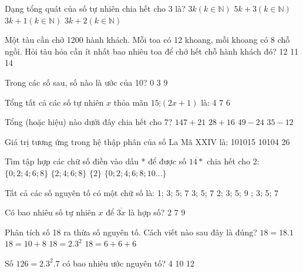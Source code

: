 \begin{ex}
Dạng tổng quát của số tự nhiên chia hết cho 3 là?
\choice
{\True $3k (k\in\mathbb{N})$}
{$5k+3 (k\in\mathbb{N})$}
{$3k+1 (k\in\mathbb{N})$}
{$3k+2 (k\in\mathbb{N})$}
\end{ex}

\begin{ex}
Một tàu cần chở 1200 hành khách. Mỗi toa có 12 khoang, mỗi khoang có 8 chỗ ngồi. Hỏi tàu hỏa cần ít nhất bao nhiêu toa để chở hết chỗ hành khách đó?
\choice
{12}
{}
{11}
{14}
\end{ex}

\begin{ex}
Trong các số sau, số nào là ước của 10?
\choice
{}
{0}
{3}
{9}
\end{ex}

\begin{ex}
Tổng tất cả các số tự nhiên $x$ thỏa mãn $15 \vdots (2x+1)$ là:
\choice
{}
{4}
{7}
{6}
\end{ex}

\begin{ex}
Tổng (hoặc hiệu) nào dưới đây chia hết cho 7?
\choice
{\True $147+21$}
{$28+16$}
{$49-24$}
{$35-12$}
\end{ex}

\begin{ex}
Giá trị tương ứng trong hệ thập phân của số La Mã XXIV là:
\choice
{101015}
{10104}
{}
{26}
\end{ex}

\begin{ex}
Tìm tập hợp các chữ số điền vào dấu * để được số $\overline{14*}$ chia hết cho 2:
\choice
{\True $\{0;2;4;6;8\}$}
{$\{2;4;6;8\}$}
{$\{2\}$}
{$\{0;2;4;6;8;10...\}$}
\end{ex}

\begin{ex}
Tất cả các số nguyên tố có một chữ số là:
\choice
{1; 3; 5; 7}
{3; 5; 7}
{2; 3; 5; 9}
{; 3; 5; 7}
\end{ex}

\begin{ex}
Có bao nhiêu số tự nhiên $x$ để $\overline{3x}$ là hợp số?
\choice
{2}
{}
{7}
{9}
\end{ex}

\begin{ex}
Phân tích số 18 ra thừa số nguyên tố. Cách viết nào sau đây là đúng?
\choice
{$18=18.1$}
{$18=10+8$}
{\True $18=2.3^{2}$}
{$18=6+6+6$}
\end{ex}

\begin{ex}
Số $126=2.3^{2}.7$ có bao nhiêu ước nguyên tố?
\choice
{}
{4}
{10}
{12}
\end{ex}
